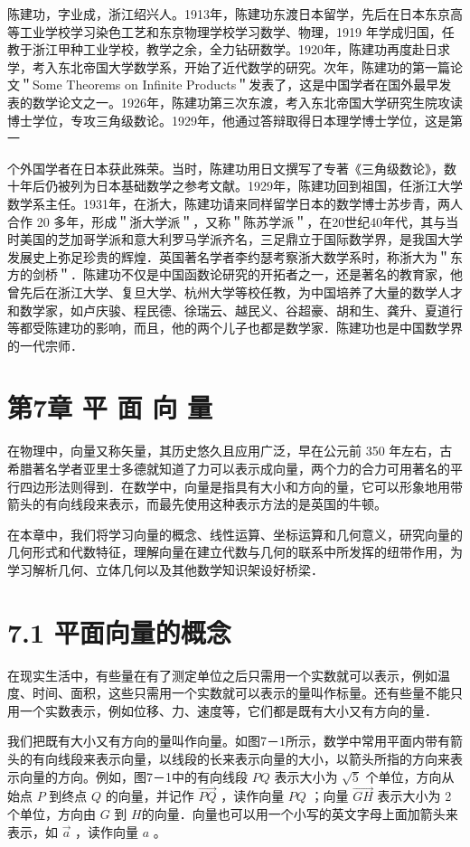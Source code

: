 \documentclass[10pt]{article}
\begin{document}
陈建功，字业成，浙江绍兴人。1913年，陈建功东渡日本留学，先后在日本东京高等工业学校学习染色工艺和东京物理学校学习数学、物理，1919 年学成归国，任教于浙江甲种工业学校，教学之余，全力钻研数学。1920年，陈建功再度赴日求学，考入东北帝国大学数学系，开始了近代数学的研究。次年，陈建功的第一篇论文＂Some Theorems on Infinite Products＂发表了，这是中国学者在国外最早发表的数学论文之一。1926年，陈建功第三次东渡，考入东北帝国大学研究生院攻读博士学位，专攻三角级数论。1929年，他通过答辩取得日本理学博士学位，这是第一

个外国学者在日本获此殊荣。当时，陈建功用日文撰写了专著《三角级数论》，数十年后仍被列为日本基础数学之参考文献。1929年，陈建功回到祖国，任浙江大学数学系主任。1931年，在浙大，陈建功请来同样留学日本的数学博士苏步青，两人合作 20 多年，形成＂浙大学派＂，又称＂陈苏学派＂，在20世纪40年代，其与当时美国的芝加哥学派和意大利罗马学派齐名，三足鼎立于国际数学界，是我国大学发展史上弥足珍贵的辉煌．英国著名学者李约瑟考察浙大数学系时，称浙大为＂东方的剑桥＂．陈建功不仅是中国函数论研究的开拓者之一，还是著名的教育家，他曾先后在浙江大学、复旦大学、杭州大学等校任教，为中国培养了大量的数学人才和数学家，如卢庆骏、程民德、徐瑞云、越民义、谷超豪、胡和生、龚升、夏道行等都受陈建功的影响，而且，他的两个儿子也都是数学家．陈建功也是中国数学界的一代宗师．

\section*{第7章 平 面 向 量}
在物理中，向量又称矢量，其历史悠久且应用广泛，早在公元前 350 年左右，古希腊著名学者亚里士多德就知道了力可以表示成向量，两个力的合力可用著名的平行四边形法则得到．在数学中，向量是指具有大小和方向的量，它可以形象地用带箭头的有向线段来表示，而最先使用这种表示方法的是英国的牛顿。

在本章中，我们将学习向量的概念、线性运算、坐标运算和几何意义，研究向量的几何形式和代数特征，理解向量在建立代数与几何的联系中所发挥的纽带作用，为学习解析几何、立体几何以及其他数学知识架设好桥梁．

\section*{7.1 平面向量的概念}
在现实生活中，有些量在有了测定单位之后只需用一个实数就可以表示，例如温度、时间、面积，这些只需用一个实数就可以表示的量叫作标量。还有些量不能只用一个实数表示，例如位移、力、速度等，它们都是既有大小又有方向的量．

我们把既有大小又有方向的量叫作向量。如图7－1所示，数学中常用平面内带有箭头的有向线段来表示向量，以线段的长来表示向量的大小，以箭头所指的方向来表示向量的方向。例如，图7－1中的有向线段 \(P Q\) 表示大小为 \(\sqrt{5}\) 个单位，方向从始点 \(P\) 到终点 \(Q\) 的向量，并记作 \(\overrightarrow{P Q}\) ，读作向量 \(P Q\) ；向量 \(\overrightarrow{G H}\) 表示大小为 2 个单位，方向由 \(G\) 到 \(H\)的向量．向量也可以用一个小写的英文字母上面加箭头来表示，如 \(\vec{a}\) ，读作向量 \(a\) 。
\end{document}
